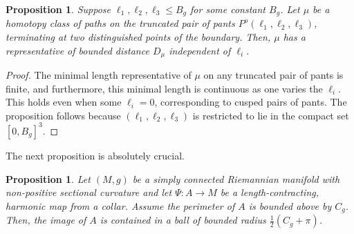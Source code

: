 \documentclass[10pt,letterpaper,english,reqno]{amsart}
\numberwithin{equation}{subsection}
\newtheorem{proposition}[theorem]{Proposition}
\theoremstyle{definition}
\begin{document}
\begin{proposition}\label{bounded-truncated} Suppose
$\ell_1,\ell_2,\ell_3\leq B_g$ for some constant $B_g$.
Let $\mu$ be a homotopy class of paths on
the truncated pair of pants $P^o(\ell_1,\ell_2,\ell_3)$,
terminating at two distinguished points of the boundary.
Then, $\mu$ has a representative of bounded
distance $D_\mu$ independent of $\ell_i$. \end{proposition}

\begin{proof} The minimal length representative of $\mu$
on any truncated pair of pants is finite, and furthermore,
this minimal length is continuous as one varies the $\ell_i$.
This holds even when some $\ell_i=0$, corresponding to cusped
pairs of pants. The proposition follows because 
$(\ell_1,\ell_2,\ell_3)$ is restricted to lie in the compact set $[0,B_g]^3$.
\end{proof}

The next proposition is absolutely crucial.

\begin{proposition}\label{key-lemma} Let $(M,g)$ be a simply connected
Riemannian manifold with non-positive sectional curvature and let $\Psi\colon A\to M$ be a length-contracting, harmonic map from a collar. Assume
the perimeter of $A$ is bounded above by $C_g$.
Then, the image of $A$ is contained in a ball of bounded radius 
$\tfrac{1}{2}(C_g+\pi)$. \end{proposition}
\end{document}
